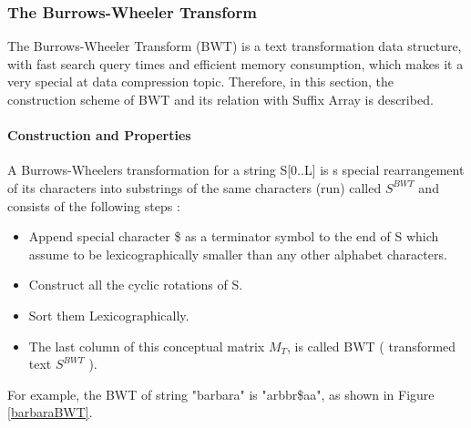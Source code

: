 \documentclass[11pt,a4paper]{report}
\begin{document}
\subsubsection{The Burrows-Wheeler Transform} 
\label{The Burrows-Wheeler Transform}


The Burrows-Wheeler Transform (BWT) is a text transformation data structure, 
with fast search query times and efficient memory consumption, which makes 
it a very special at data compression topic.
Therefore, in this section, the construction scheme of BWT and its relation 
with Suffix Array is described.\\



\paragraph{Construction and Properties}

A Burrows-Wheelers transformation for a string S[0..L] is s special rearrangement 
of its characters into substrings of the same characters (run) called $S^{BWT}$ 
and consists of the following steps \cite{bwt}:

\begin{itemize} 
	\item Append special character \$ as a terminator symbol to the end of S 
	which assume to be lexicographically smaller than any other alphabet 
	characters.
	\item  Construct all the cyclic rotations of S.
	\item  Sort them Lexicographically.
	\item The last column of this conceptual matrix \emph{$M_{T}$}, is called 
	BWT ( transformed text $S^{BWT}$ ).
\end{itemize}


For example, the BWT of string "barbara" is "arbbr\$aa", as shown in Figure 
\ref{barbaraBWT}.\\
\end{document}
